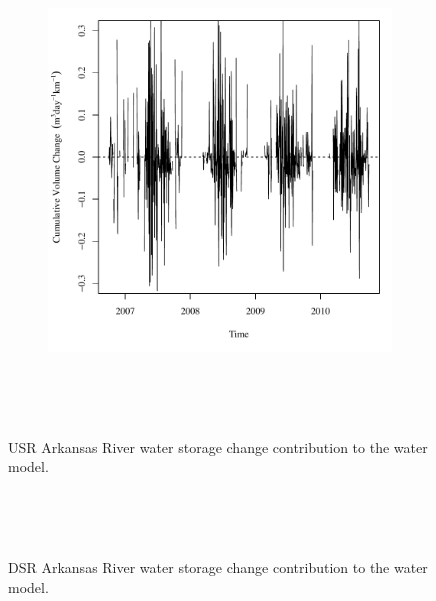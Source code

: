 \begin{linenumbers}
\begin{figure}[htbp]
\centering
	\begin{subfigure}{0.5\textwidth}
		\centering
		\includegraphics[width=0.9\linewidth]{"Figures/Results_USR/Deterministic/Balance Water - storage"}
		\label{sub:USRWaterStoreD}
	\end{subfigure}\\%
	\begin{subfigure}{0.5\textwidth}
		\centering
		\missingfigure{}
		\label{sub:USRWaterStoreS}
	\end{subfigure}\\
	\caption[USR Arkansas River water storage change contribution to the water model.]{USR Arkansas River water storage change contribution to the water model.}
	\label{fig:USRWaterStore}
\end{figure}

\begin{figure}[htbp]
	\centering
	\begin{subfigure}{0.5\textwidth}
		\centering
		\missingfigure{}
	\end{subfigure}\\%
	\begin{subfigure}{0.5\textwidth}
		\centering
		\missingfigure{}
	\end{subfigure}\\
	\caption[DSR Arkansas River water storage change contribution to the water model.]{DSR Arkansas River water storage change contribution to the water model.}
	\label{fig:DSRWaterStore}
\end{figure}


\end{linenumbers}
